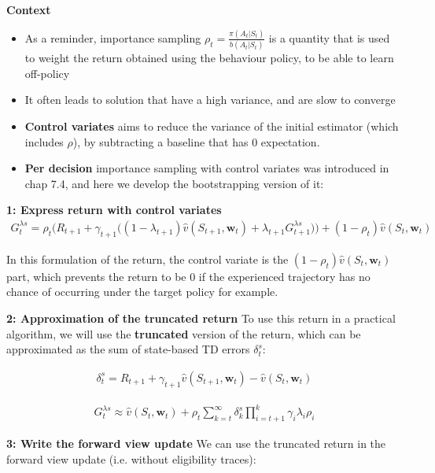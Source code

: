 \documentclass[sutton_barto_notes.tex]{subfiles}
\begin{document}
 \textbf{Context} 
\begin{itemize}
\item As a reminder, importance sampling $\rho_t = \frac{\pi(A_t|S_t)}{b(A_t|S_t)}$ is a quantity that is used to weight the return obtained using the behaviour policy, to be able to learn off-policy 
\item It often leads to solution that have a high variance, and are slow to converge 
\item \textbf{Control variates} aims to reduce the variance of the initial estimator (which includes $\rho$), by subtracting a baseline that has $0$ expectation. 
\item \textbf{Per decision} importance sampling with control variates was introduced in chap 7.4, and here we develop the bootstrapping version of it: 
\end{itemize}

 \textbf{1: Express return with control variates}
\begin{align}
G_t^{\lambda s} = \rho_t \Big( R_{t+1} + \gamma_{t+1} \big( (1 - \lambda_{t+1}) \hat{v}(S_{t+1}, \mathbf{w}_{t}) + \lambda_{t+1} G_{t+1}^{\lambda s}\big) \Big) + (1 - \rho_t) \hat{v}(S_{t}, \mathbf{w}_{t}) \label{eq:12.22}\tag{12.22}
\end{align} 

 In this formulation of the return, the control variate is the $(1 - \rho_t) \hat{v}(S_{t}, \mathbf{w}_{t})$ part, which prevents the return to be $0$ if the experienced trajectory has no chance of occurring under the target policy for example. 

 \textbf{2: Approximation of the truncated return} 
To use this return in a practical algorithm, we will use the \textbf{truncated} version of the return, which can be approximated as the sum of state-based TD errors $\delta_t^s$: 

\begin{align}
\delta_t^s = R_{t+1} + \gamma_{t+1} \hat{v}(S_{t+1}, \mathbf{w}_{t}) - \hat{v}(S_{t}, \mathbf{w}_{t}) \label{eq:12.23}\tag{12.23}
\end{align}

\begin{align}
G_t^{\lambda s} \approx \hat{v}(S_{t}, \mathbf{w}_{t}) + \rho_t \sum_{k=t}^{\infty} \delta_k^s \prod_{i=t+1}^k \gamma_i \lambda_i \rho_i \label{eq:12.24}\tag{12.24}
\end{align}

 \textbf{3: Write the forward view update}
We can use the truncated return in the forward view update (i.e. without eligibility traces): 
\end{document}
